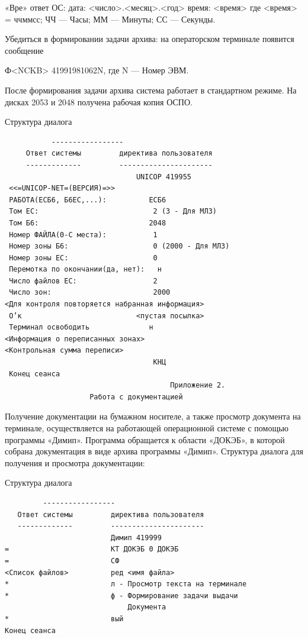 \documentclass[11pt,a4paper]{article}
\begin{document}
«Вре» ответ ОС: дата: <число>.<месяц>.<год> время: <время> где <время> = ччммсс; ЧЧ --- Часы; ММ --- Минуты; СС --- Секунды.

Убедиться в формировании задачи архива: на операторском терминале появится сообщение

Ф<NCKB> 41991981062N, где N --- Номер ЭВМ.

После формирования задачи архива система работает в стандартном режиме. На дисках 2053 и 2048 получена рабочая копия ОСПО.

\begin{center}Структура диалога\end{center}
\begin{center}\small
\begin{BVerbatim}
           -----------------
     Ответ системы         директива пользователя
     -------------         ----------------------
                               UNICOP 419955
 <<=UNICOP-NET=(ВЕРСИЯ)=>>
 РАБОТА(ЕСБ6, Б6ЕС,...):          ЕСБ6
 Том ЕС:                           2 (3 - Для МЛ3)
 Том Б6:                          2048
 Номер ФАЙЛА(0-С места):           1
 Номер зоны Б6:                    0 (2000 - Для МЛ3)
 Номер зоны ЕС:                    0
 Перемотка по окончании(да, нет):   н
 Число файлов ЕС:                  2
 Число зон:                        2000
<Для контроля повторяется набранная информация>
 О’к                           <пустая посылка>
 Терминал освободить              н
<Информация о переписанных зонах>
<Контрольная сумма переписи>
                                   КНЦ
 Конец сеанса
                                       Приложение 2.
                    Работа с документацией
\end{BVerbatim}
\end{center}

Получение документации на бумажном носителе, а также просмотр документа на терминале, осуществляется на работающей операционной системе с помощью программы «Димип». Программа обращается к области «ДОКЭБ», в которой собрана документация в виде архива программы «Димип». Структура диалога для получения и просмотра документации:

\begin{center}Структура диалога\end{center}
\begin{center}\small
\begin{BVerbatim}
         -----------------
   Ответ системы         директива пользователя
   -------------         ----------------------
                         Димип 419999
=                        КТ ДОКЭБ 0 ДОКЭБ
=                        СФ
<Список файлов>          ред <имя файла>
*                        л - Просмотр текста на терминале
*                        ф - Формирование задачи выдачи
                             Документа
*                        вый
Конец сеанса
\end{BVerbatim}
\end{center}
\end{document}
